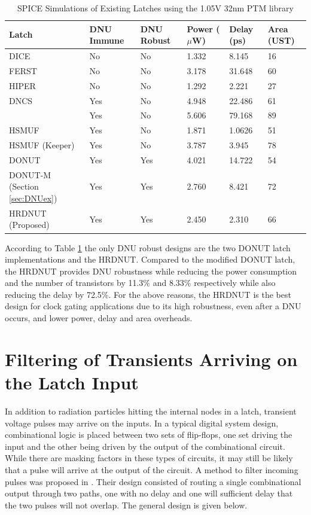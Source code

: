 \begin{table}[h]
	\begin{center}
		\caption{SPICE Simulations of Existing Latches using the 1.05V 32nm PTM library }
		\label{table:rtable}
		\begin{tabular}{|m{8em}|m{5em}|m{5em}|m{3em}|m{3em}|m{3em}|}
			\hline
			Latch & DNU Immune & DNU Robust & Power ($\mu$W) & Delay (ps) & Area (UST)\\ 
			\hline
			DICE & No & No & 1.332 & 8.145 & 16 \\
			\hline
			FERST & No & No & 3.178 & 31.648 & 60 \\
			\hline
			HIPER & No & No & 1.292 & 2.221 & 27 \\
			\hhline{|=|=|=|=|=|=|}
			DNCS & Yes & No & 4.948 & 22.486 & 61 \\
			\hline
			\cite{Inter} & Yes & No & 5.606 & 79.168 & 89 \\
			\hline
			HSMUF & Yes & No & 1.871 & 1.0626 & 51 \\
			\hline
			HSMUF (Keeper) & Yes & No & 3.787 & 3.945 & 78 \\
			\hhline{|=|=|=|=|=|=|}
			DONUT \cite{DONUT} & Yes & Yes & 4.021 & 14.722 & 54 \\ 
			\hline
			DONUT-M \newline (Section \ref{sec:DNUex}) & Yes & Yes & 2.760 & 8.421 & 72\\
			\hline
			HRDNUT \newline (Proposed) & Yes & Yes & 2.450 & 2.310 & 66 \\
			\hline
		\end{tabular}
	\end{center}
\end{table}

According to Table \ref{table:rtable} the only DNU robust designs are the two DONUT latch implementations and the HRDNUT. Compared to the modified DONUT latch, the HRDNUT provides DNU robustness while reducing the power consumption and the number of transistors by 11.3\% and 8.33\% respectively while also reducing the delay by 72.5\%. For the above reasons, the HRDNUT is the best design for clock gating applications due to its high robustness, even after a DNU occurs, and lower power, delay and area overheads.

\section{Filtering of Transients Arriving on the Latch Input}
In addition to radiation particles hitting the internal nodes in a latch, transient voltage pulses may arrive on the inputs. In a typical digital system design, combinational logic is placed between two sets of flip-flops, one set driving the input and the other being driven by the output of the combinational circuit. While there are masking factors in these types of circuits, it may still be likely that a pulse will arrive at the output of the circuit. A method to filter incoming pulses was proposed in \cite{FERST}. Their design consisted of routing a single combinational output through two paths, one with no delay and one will sufficient delay that the two pulses will not overlap. The general design is given below.

